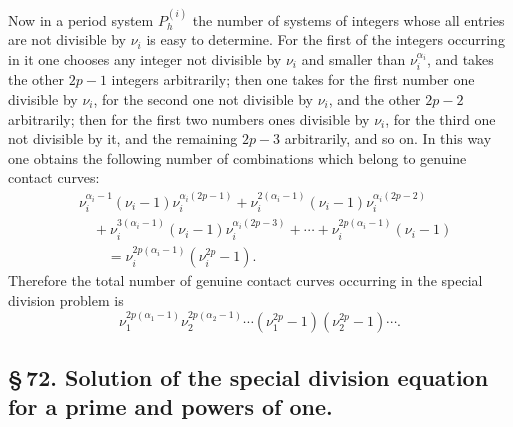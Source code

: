 \documentclass[10pt]{article}
\begin{document}
Now in a period system \(P_h^{(i)}\) the number of systems of integers whose all entries are not divisible by \(\nu_i\) is easy to determine. For the first of the integers occurring in it one chooses any integer not divisible by \(\nu_i\) and smaller than \(\nu_i^{\alpha_i}\), and takes the other \(2p-1\) integers arbitrarily; then one takes for the first number one divisible by \(\nu_i\), for the second one not divisible by \(\nu_i\), and the other \(2p-2\) arbitrarily; then for the first two numbers ones divisible by \(\nu_i\), for the third one not divisible by it, and the remaining \(2p-3\) arbitrarily, and so on. In this way one obtains the following number of combinations which belong to genuine contact curves:
\[
\begin{aligned}
&\nu_i^{\alpha_i-1}(\nu_i-1)\nu_i^{\alpha_i(2p-1)}
+\nu_i^{2(\alpha_i-1)}(\nu_i-1)\nu_i^{\alpha_i(2p-2)}\\
&\quad+\nu_i^{3(\alpha_i-1)}(\nu_i-1)\nu_i^{\alpha_i(2p-3)}
+\cdots+\nu_i^{2p(\alpha_i-1)}(\nu_i-1)\\
&\qquad=\nu_i^{2p(\alpha_i-1)}(\nu_i^{2p}-1).
\end{aligned}
\]
Therefore the total number of genuine contact curves occurring in the special division problem is
\[
\nu_1^{2p(\alpha_1-1)}\nu_2^{2p(\alpha_2-1)}\cdots
(\nu_1^{2p}-1)(\nu_2^{2p}-1)\cdots.
\]

\subsection*{\S\,72. Solution of the special division equation for a prime and powers of one.}
\end{document}
